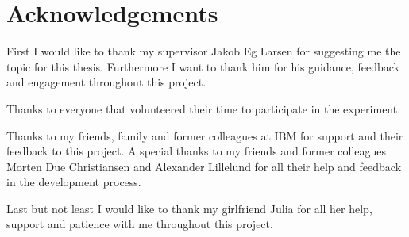 \chapter{Acknowledgements}

First I would like to thank my supervisor Jakob Eg Larsen for suggesting me the topic for this thesis. Furthermore I want to thank him for his guidance, feedback and engagement throughout this project.

Thanks to everyone that volunteered their time to participate in the experiment.

Thanks to my friends, family and former colleagues at IBM for support and their feedback to this project. A special thanks to my friends and former colleagues Morten Due Christiansen and Alexander Lillelund for all their help and feedback in the development process.

Last but not least I would like to thank my girlfriend Julia for all her help, support and patience with me throughout this project.